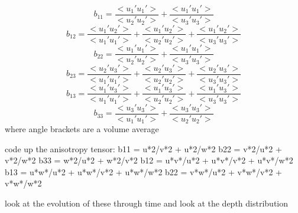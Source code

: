 \documentclass[letterpaper,10pt]{report}
\begin{document}
\begin{equation}
b_{11} = \frac{<u_1'u_1'>}{<u_2'u_2'>} 
+ \frac{<u_1'u_1'>}{<u_3'u_3'>} 
\end{equation}
\begin{equation}
	b_{12} = \frac{<u_1'u_2'>}{<u_1'u_1'>} 
	              + \frac{<u_1'u_2'>}{<u_2'u_2'>} 
	              + \frac{<u_1'u_2'>}{<u_3'u_3'>}
\end{equation}
\begin{equation}
b_{22} =  \frac{<u_1'u_1'>}{<u_2'u_2'>} 
+ \frac{<u_1'u_1'>}{<u_3'u_3'>}
\end{equation}
\begin{equation}
b_{23} = \frac{<u_2'u_3'>}{<u_1'u_1'>} 
+ \frac{<u_2'u_3'>}{<u_2'u_2'>} 
+ \frac{<u_2'u_3'>}{<u_3'u_3'>}
\end{equation}
\begin{equation}
b_{13} = \frac{<u_1'u_3'>}{<u_1'u_1'>} 
+ \frac{<u_1'u_3'>}{<u_2'u_2'>} 
+ \frac{<u_1'u_3'>}{<u_3'u_3'>}
\end{equation}
\begin{equation}
b_{33} = \frac{<u_3'u_3'>}{<u_1'u_1'>} 
+ \frac{<u_3'u_3'>}{<u_2'u_2'>} 
\end{equation}
where angle brackets are a volume average

code up the anisotropy tensor:
b11 = u*2/v*2 + u*2/w*2
b22 = v*2/u*2 + v*2/w*2
b33 = w*2/u*2 + w*2/v*2
b12 = u*v*/u*2 + u*v*/v*2 + u*v*/w*2
b13 = u*w*/u*2 + u*w*/v*2 + u*w*/w*2
b22 = v*w*/u*2 + v*w*/v*2 + v*w*/w*2

look at the evolution of these through time
and look at the depth distribution
\end{document}
